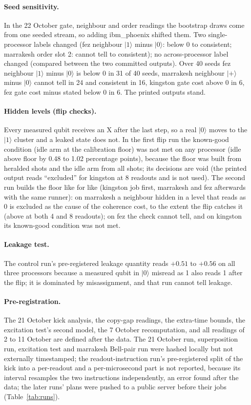\documentclass[reprint,amsmath,amssymb,aps,superscriptaddress,nofootinbib]{revtex4-2}
\begin{document}
\paragraph*{Seed sensitivity.} In the 22 October gate, neighbour and order readings the bootstrap draws come from one seeded stream, so adding ibm\_phoenix shifted them. Two single-processor labels changed (fez neighbour $|1\rangle$ minus $|0\rangle$: below 0 to consistent; marrakesh order slot 2: cannot tell to consistent); no across-processor label changed (compared between the two committed outputs). Over 40 seeds fez neighbour $|1\rangle$ minus $|0\rangle$ is below 0 in 31 of 40 seeds, marrakesh neighbour $|+\rangle$ minus $|0\rangle$ cannot tell in 24 and consistent in 16, kingston gate cost above 0 in 6, fez gate cost minus stated below 0 in 6. The printed outputs stand.

\paragraph*{Hidden levels (flip checks).} Every measured qubit receives an X after the last step, so a real $|0\rangle$ moves to the $|1\rangle$ cluster and a leaked state does not. In the first flip run the known-good condition (idle arm at the calibration floor) was not met on any processor (idle above floor by 0.48 to 1.02 percentage points), because the floor was built from heralded shots and the idle arm from all shots; its decisions are void (the printed output reads ``excluded'' for kingston at 8 readouts and is not used). The second run builds the floor like for like (kingston job first, marrakesh and fez afterwards with the same runner): on marrakesh a neighbour hidden in a level that reads as 0 is excluded as the cause of the coherence cost, to the extent the flip catches it (above at both 4 and 8 readouts); on fez the check cannot tell, and on kingston its known-good condition was not met.

\paragraph*{Leakage test.} The control run's pre-registered leakage quantity reads $+0.51$ to $+0.56$ on all three processors because a measured qubit in $|0\rangle$ misread as 1 also reads 1 after the flip; it is dominated by misassignment, and that run cannot tell leakage.

\paragraph*{Pre-registration.} The 21 October kick analysis, the copy-gap readings, the extra-time bounds, the excitation test's second model, the 7 October recomputation, and all readings of 2 to 11 October are defined after the data. The 21 October run, superposition run, excitation test and marrakesh Bell-pair run were hashed locally but not externally timestamped; the readout-instruction run's pre-registered split of the kick into a per-readout and a per-microsecond part is not reported, because its interval resamples the two instructions independently, an error found after the data; the later runs' plans were pushed to a public server before their jobs (Table~\ref{tab:runs}).
\end{document}
